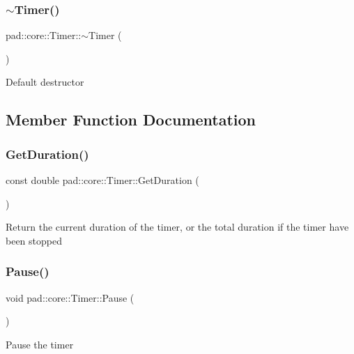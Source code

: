 \subsubsection{\texorpdfstring{$\sim$\+Timer()}{~Timer()}}
{\footnotesize\ttfamily pad\+::core\+::\+Timer\+::$\sim$\+Timer (\begin{DoxyParamCaption}{ }\end{DoxyParamCaption})}

Default destructor 

\subsection{Member Function Documentation}
\mbox{\label{classpad_1_1core_1_1_timer_a81ee8c0bd00ea230edd6c177b578ae41}} 
\subsubsection{\texorpdfstring{Get\+Duration()}{GetDuration()}}
{\footnotesize\ttfamily const double pad\+::core\+::\+Timer\+::\+Get\+Duration (\begin{DoxyParamCaption}{ }\end{DoxyParamCaption})}

Return the current duration of the timer, or the total duration if the timer have been stopped \mbox{\label{classpad_1_1core_1_1_timer_a150118ce8a2eaa2aa2e5e827511356f9}} 
\subsubsection{\texorpdfstring{Pause()}{Pause()}}
{\footnotesize\ttfamily void pad\+::core\+::\+Timer\+::\+Pause (\begin{DoxyParamCaption}{ }\end{DoxyParamCaption})}

Pause the timer \mbox{\label{classpad_1_1core_1_1_timer_ac3c92037256639490ad979987c58a3d3}} 
